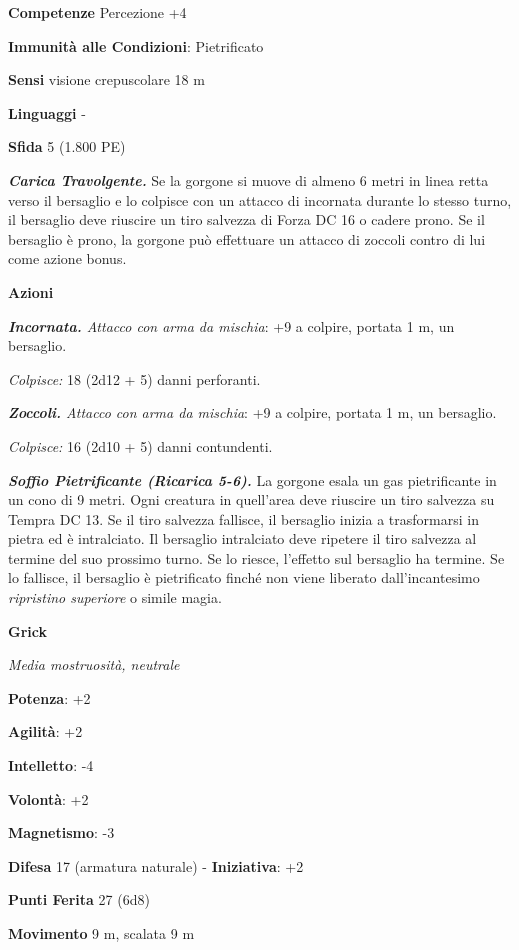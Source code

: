\begin{multicols}{2}
\textbf{Competenze} Percezione +4

\textbf{Immunità alle Condizioni}: Pietrificato

\textbf{Sensi} visione crepuscolare 18 m

\textbf{Linguaggi} -

\textbf{Sfida} 5 (1.800 PE)\smallskip

\emph{\textbf{Carica Travolgente.}} Se la gorgone si muove di almeno 6
metri in linea retta verso il bersaglio e lo colpisce con un attacco di
incornata durante lo stesso turno, il bersaglio deve riuscire un tiro
salvezza di Forza DC 16 o cadere prono. Se il bersaglio è prono, la
gorgone può effettuare un attacco di zoccoli contro di lui come azione
bonus.

\smallskip\textbf{Azioni}

\emph{\textbf{Incornata.} Attacco con arma da mischia}: +9 a colpire,
portata 1 m, un bersaglio.

\emph{Colpisce:} 18 (2d12 + 5) danni perforanti.

\emph{\textbf{Zoccoli.} Attacco con arma da mischia}: +9 a colpire,
portata 1 m, un bersaglio.

\emph{Colpisce:} 16 (2d10 + 5) danni contundenti.

\emph{\textbf{Soffio Pietrificante (Ricarica 5-6).}} La gorgone esala un
gas pietrificante in un cono di 9 metri. Ogni creatura in quell'area
deve riuscire un tiro salvezza su Tempra DC 13. Se il tiro
salvezza fallisce, il bersaglio inizia a trasformarsi in pietra ed è
intralciato. Il bersaglio intralciato deve ripetere il tiro salvezza al
termine del suo prossimo turno. Se lo riesce, l'effetto sul bersaglio ha
termine. Se lo fallisce, il bersaglio è pietrificato finché non viene
liberato dall'incantesimo \emph{ripristino superiore} o simile magia.

\textbf{Grick}

\emph{Media mostruosità, neutrale}

\textbf{Potenza}: +2

\textbf{Agilità}: +2

\textbf{Intelletto}: -4

\textbf{Volontà}: +2

\textbf{Magnetismo}: -3

\textbf{Difesa} 17 (armatura naturale) - \textbf{Iniziativa}: +2

\textbf{Punti Ferita} 27 (6d8)

\textbf{Movimento} 9 m, scalata 9 m


\end{multicols}
